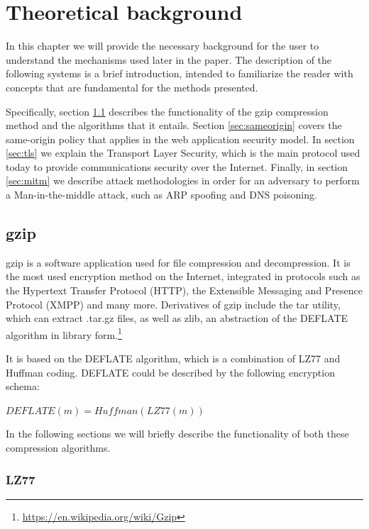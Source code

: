 \chapter{Theoretical background}\label{background}

In this chapter we will provide the necessary background for the user to
understand the mechanisms used later in the paper. The description of the
following systems is a brief introduction, intended to familiarize the reader
with concepts that are fundamental for the methods presented.

Specifically, section \ref{sec:gzip} describes the functionality of the gzip
compression method and the algorithms that it entails. Section
\ref{sec:sameorigin} covers the same-origin policy that applies in the web
application security model. In section \ref{sec:tls} we explain the Transport
Layer Security, which is the main protocol used today to provide communications
security over the Internet. Finally, in section \ref{sec:mitm} we describe
attack methodologies in order for an adversary to perform a Man-in-the-middle
attack, such as ARP spoofing and DNS poisoning.

\section{gzip}\label{sec:gzip}

gzip is a software application used for file compression and decompression. It
is the most used encryption method on the Internet, integrated in protocols such
as the Hypertext Transfer Protocol (HTTP), the Extensible Messaging and Presence
Protocol (XMPP) and many more. Derivatives of gzip include the tar utility,
which can extract .tar.gz files, as well as zlib, an abstraction of the DEFLATE
algorithm in library form.\footnote{\url{https://en.wikipedia.org/wiki/Gzip}}

It is based on the DEFLATE algorithm, which is a combination of LZ77 and Huffman
coding. DEFLATE could be described by the following encryption schema:

\begin{math}DEFLATE(m) = Huffman(LZ77(m))\end{math}

In the following sections we will briefly describe the functionality of both
these compression algorithms.

\subsection{LZ77}\label{subsec:lz77}

